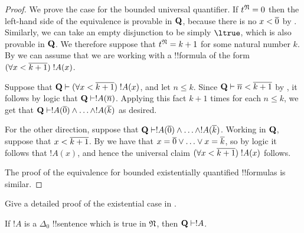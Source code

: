 \documentclass[../../../include/open-logic-section]{subfiles}
\begin{document}
\begin{proof}
    We prove the case for the bounded universal quantifier.
    If $t^\Struct{N} = 0$ then the left-hand side of the
    equivalence is provable in $\mathbf{Q}$, because there is no
    $x<\overline{0}$ by .
    Similarly, we can take an empty disjunction to be simply
    $\ltrue$, which is also provable in $\mathbf{Q}$.
    We therefore suppose that $t^\Struct{N} = k+1$ for some
    natural number $k$. By  we
    can assume that we are working with a !!{formula} of the
    form $(\forall x<\overline{k+1})\; !A(x)$.
    
    Suppose that $\Th{Q} \Proves \bforall{x<\num{k+1}}{!A(x)}$,
    and let $n \leq k$. Since $\Th{Q} \Proves \num n < \num{k+1}$
    by , it follows by logic that
    $\Th{Q} \Proves !A(\num n)$. Applying this fact $k+1$ times
    for each $n \leq k$, we get that $\Th{Q} \Proves !A(\num 0)
    \land \dotsc \land !A(\num k)$ as desired.
    
    For the other direction, suppose that $\Th{Q} \Proves
    !A(\num 0) \land \dotsc \land !A(\num k)$. Working in
    $\mathbf{Q}$, suppose that $x < \overline{k+1}$.
    By  we have that
    $x = \overline{0} \lor \dotsc \lor x = \overline{k}$, so by logic it
    follows that $!A(x)$, and hence the universal claim
    $(\forall x<\overline{k+1})\; !A(x)$ follows.
    
    The proof of the equivalence for bounded existentially
    quantified !!{formula}s is similar.
\end{proof}

\begin{prob}
Give a detailed proof of the existential case in
.
\end{prob}

\begin{lem}
If $!A$ is a $\Delta_0$ !!{sentence} which is true in
$\Struct{N}$, then $\Th{Q} \Proves !A$.
\end{lem}
\end{document}
